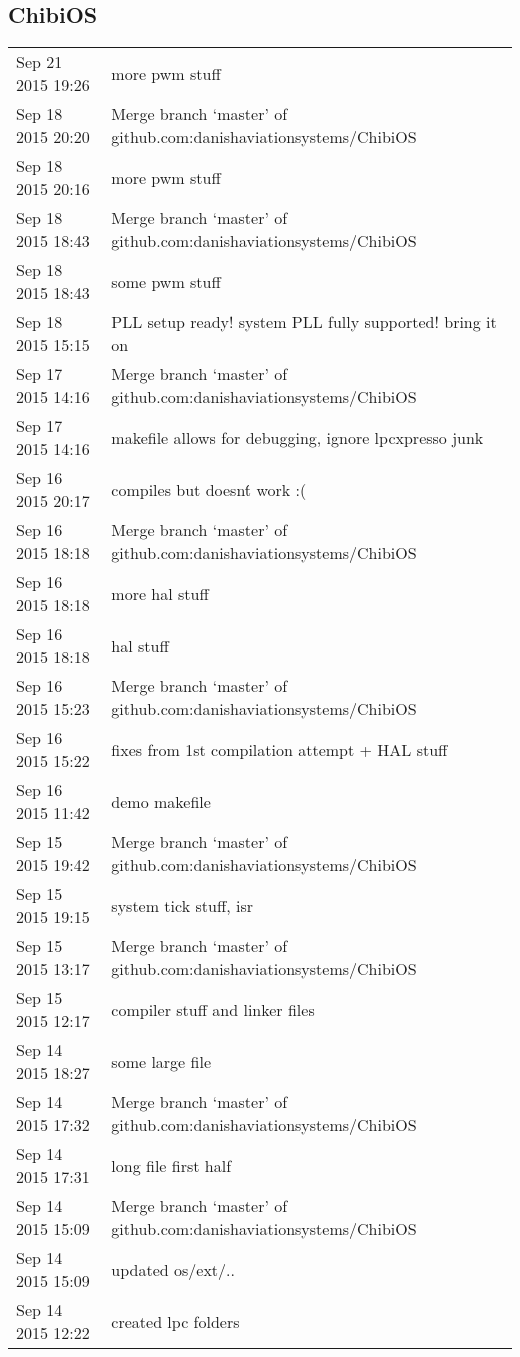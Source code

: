 \subsection{ChibiOS}

\begin{tabular}{ l || p{9.5cm} }
	\hline			
	Sep 21 2015 19:26	& more pwm stuff	\\
	Sep 18 2015 20:20	& Merge branch `master' of github.com:danishaviationsystems/ChibiOS	\\
	Sep 18 2015 20:16	& more pwm stuff	\\
	Sep 18 2015 18:43	& Merge branch `master' of github.com:danishaviationsystems/ChibiOS	\\
	Sep 18 2015 18:43	& some pwm stuff	\\
	Sep 18 2015 15:15	& PLL setup ready! system PLL fully supported! bring it on	\\
	Sep 17 2015 14:16	& Merge branch `master' of github.com:danishaviationsystems/ChibiOS	\\
	Sep 17 2015 14:16	& makefile allows for debugging, ignore lpcxpresso junk	\\
	Sep 16 2015 20:17	& compiles but doesn\'t work :(	\\
	Sep 16 2015 18:18	& Merge branch `master' of github.com:danishaviationsystems/ChibiOS	\\
	Sep 16 2015 18:18	& more hal stuff	\\
	Sep 16 2015 18:18	& hal stuff	\\
	Sep 16 2015 15:23	& Merge branch `master' of github.com:danishaviationsystems/ChibiOS	\\
	Sep 16 2015 15:22	& fixes from 1st compilation attempt + HAL stuff	\\
	Sep 16 2015 11:42	& demo makefile	\\
	Sep 15 2015 19:42	& Merge branch `master' of github.com:danishaviationsystems/ChibiOS	\\
	Sep 15 2015 19:15	& system tick stuff, isr	\\
	Sep 15 2015 13:17	& Merge branch `master' of github.com:danishaviationsystems/ChibiOS	\\
	Sep 15 2015 12:17	& compiler stuff and linker files	\\
	Sep 14 2015 18:27	& some large file	\\
	Sep 14 2015 17:32	& Merge branch `master' of github.com:danishaviationsystems/ChibiOS	\\
	Sep 14 2015 17:31	& long file first half	\\
	Sep 14 2015 15:09	& Merge branch `master' of github.com:danishaviationsystems/ChibiOS	\\
	Sep 14 2015 15:09	& updated os/ext/..	\\
	Sep 14 2015 12:22	& created lpc folders	\\
	\hline  
\end{tabular}
